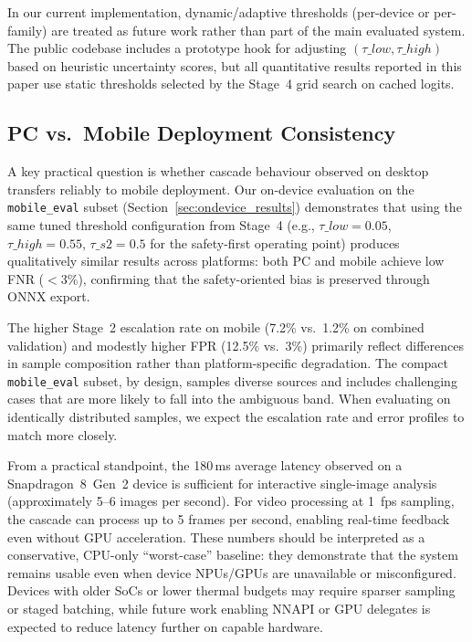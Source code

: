 In our current implementation, dynamic/adaptive thresholds (per\hyp device or per\hyp family) are treated as future work rather than part of the main evaluated system. The public codebase includes a prototype hook for adjusting $(\tau\_{low},\tau\_{high})$ based on heuristic uncertainty scores, but all quantitative results reported in this paper use static thresholds selected by the Stage~4 grid search on cached logits.

\subsection*{PC vs.\ Mobile Deployment Consistency}
A key practical question is whether cascade behaviour observed on desktop transfers reliably to mobile deployment. Our on\hyp device evaluation on the \texttt{mobile\_eval} subset (Section~\ref{sec:ondevice_results}) demonstrates that using the same tuned threshold configuration from Stage~4 (e.g., $\tau\_{low}=0.05$, $\tau\_{high}=0.55$, $\tau\_{s2}=0.5$ for the safety\hyp first operating point) produces qualitatively similar results across platforms: both PC and mobile achieve low FNR ($<$3\%), confirming that the safety\hyp oriented bias is preserved through ONNX export.

The higher Stage~2 escalation rate on mobile (7.2\% vs.\ 1.2\% on combined validation) and modestly higher FPR (12.5\% vs.\ 3\%) primarily reflect differences in sample composition rather than platform\hyp specific degradation. The compact \texttt{mobile\_eval} subset, by design, samples diverse sources and includes challenging cases that are more likely to fall into the ambiguous band. When evaluating on identically distributed samples, we expect the escalation rate and error profiles to match more closely.

From a practical standpoint, the 180\,ms average latency observed on a Snapdragon~8~Gen~2 device is sufficient for interactive single\hyp image analysis (approximately 5--6 images per second). For video processing at 1~fps sampling, the cascade can process up to 5 frames per second, enabling real\hyp time feedback even without GPU acceleration. These numbers should be interpreted as a conservative, CPU\hyp only ``worst\hyp case'' baseline: they demonstrate that the system remains usable even when device NPUs/GPUs are unavailable or misconfigured. Devices with older SoCs or lower thermal budgets may require sparser sampling or staged batching, while future work enabling NNAPI or GPU delegates is expected to reduce latency further on capable hardware.

